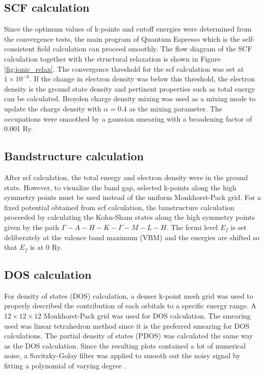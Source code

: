     \subsection{SCF calculation}
        Since the optimum values of k-points and cutoff energies were determined from the convergence tests, the main program of Quantum Espresso which is the self-consistent field calculation can proceed smoothly. The flow diagram of the SCF calculation together with the structural relaxation is shown in Figure \ref{fig:ionic_relax}. The convergence threshold for the scf calculation was set at $1 \times 10^{-6}$. If the change in electron density was below this threshold, the electron density is the ground state density and pertinent properties such as total energy can be calculated. Broyden charge density mixing was used as a mixing mode to update the charge density with  $\alpha = 0.4$ as the mixing parameter.   The occupations were smoothed by a gaussian smearing with a broadening factor of 0.001 Ry. 

        \subsection{Bandstructure calculation}
        After scf calculation, the total energy and electron density were in the ground state. However, to visualize the band gap, selected k-points along the high symmetry points must be used instead of the uniform Monkhorst-Pack grid. For a fixed potential obtained from scf calculation, the banstructure calculation proceeded by calculating the Kohn-Sham states along the high symmetry points given by the path $\Gamma-A-H-K-\Gamma-M-L-H$. The fermi level $E_f$ is set deliberately at the valence band maximum (VBM) and the energies are shifted so that $E_f$ is at  0 Ry. 

        \subsection{DOS calculation}
        For density of states (DOS) calculation, a denser k-point mesh grid was used to properly described the contribution of each orbitals to a  specific energy range. A $12 \times 12 \times 12$ Monkhorst-Pack grid was used for DOS calculation. The smearing used was linear tetrahedron method since it is the preferred smearing for DOS calculations. The partial density of states (PDOS) was calculated the same way as the  DOS calculation. Since the resulting plots contained a lot of numerical noise, a Savitzky-Golay filter was applied to smooth out the noisy signal by fitting a polynomial of varying degree \citep{Savitzky1964,Luo2005}.

